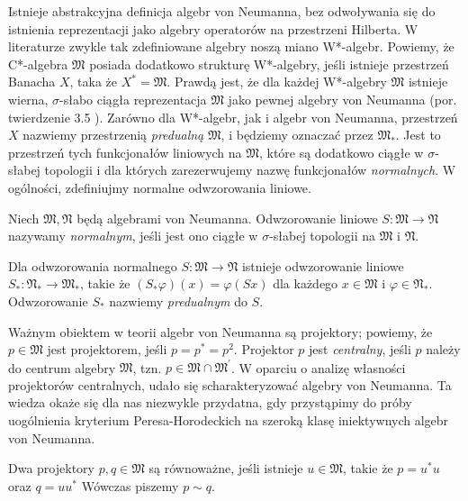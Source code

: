 Istnieje abstrakcyjna definicja algebr von Neumanna, bez odwoływania się
do istnienia reprezentacji jako algebry operatorów na przestrzeni Hilberta.
W literaturze zwykle tak zdefiniowane algebry noszą miano W*-algebr.
Powiemy, że C*-algebra $\mathfrak{M}$ posiada dodatkowo strukturę W*-algebry,
jeśli istnieje przestrzeń Banacha $X$, taka że
$X^{*} = \mathfrak{M}$.
Prawdą jest, że dla każdej W*-algebry $\mathfrak{M}$ istnieje wierna,
$\sigma$-słabo ciągła reprezentacja $\mathfrak{M}$ jako pewnej algebry von Neumanna
(por. twierdzenie 3.5 \cite{Takesaki1}).
Zarówno dla W*-algebr, jak i algebr von Neumanna,
przestrzeń $X$ nazwiemy przestrzenią \emph{predualną} $\mathfrak{M}$,
i będziemy oznaczać przez $\mathfrak{M}_{*}$.
Jest to przestrzeń tych funkcjonałów liniowych na $\mathfrak{M}$, które
są dodatkowo ciągłe w $\sigma$-słabej topologii i dla których zarezerwujemy
nazwę funkcjonałów \emph{normalnych}.
W ogólności, zdefiniujmy normalne odwzorowania liniowe.
\begin{Definition}
    \label{def:normalMap}
    Niech $\mathfrak{M}, \mathfrak{N}$ będą algebrami von Neumanna.
    Odwzorowanie liniowe $S: \mathfrak{M} \rightarrow \mathfrak{N}$
    nazywamy \emph{normalnym}, jeśli
    jest ono ciągłe w $\sigma$-słabej topologii na $\mathfrak{M}$ i $\mathfrak{N}$.
\end{Definition}
Dla odwzorowania normalnego $S: \mathfrak{M} \rightarrow \mathfrak{N}$
istnieje odwzorowanie liniowe $S_{*}: \mathfrak{N}_{*} \rightarrow \mathfrak{M}_{*}$,
takie że $(S_{*} \varphi) (x) = \varphi(Sx)$ dla każdego
$x \in \mathfrak{M}$ i $\varphi \in \mathfrak{N}_*$.
Odwzorowanie $S_{*}$ nazwiemy \emph{predualnym} do $S$.

Ważnym obiektem w teorii algebr von Neumanna są projektory; powiemy, że
$p \in \mathfrak{M}$ jest projektorem, jeśli $p = p^{*} = p^{2}$.
Projektor $p$ jest \emph{centralny}, jeśli
$p$ należy do centrum algebry $\mathfrak{M}$, tzn.
$p \in \mathfrak{M} \cap \mathfrak{M}^{\prime}$.
W oparciu o analizę własności projektorów centralnych,
udało się scharakteryzować algebry von Neumanna.
Ta wiedza okaże się dla nas niezwykle przydatna, gdy przystąpimy do próby
uogólnienia kryterium Peresa-Horodeckich na szeroką klasę iniektywnych algebr von Neumanna.

\begin{Definition}
Dwa projektory $p, q \in \mathfrak{M}$ są równoważne,
jeśli istnieje $u \in \mathfrak{M}$, takie że
$p = u^{*} u$ oraz $ q = u u^{*}$
Wówczas piszemy $p \sim q$.
\end{Definition}

